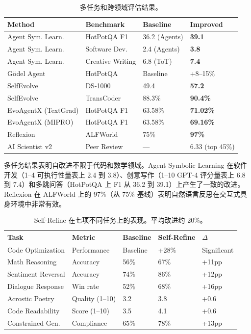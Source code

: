 \begin{table}[htbp]
\centering
\small
\caption{多任务和跨领域评估结果。}
\label{tab:eval-multitask}
\begin{tabular}{p{32mm}p{22mm}p{28mm}p{28mm}}
\toprule
\textbf{Method} & \textbf{Benchmark} & \textbf{Baseline} & \textbf{Improved} \\
\midrule
Agent Sym. Learn. & HotPotQA F1 & 36.2 (Agents) & \textbf{39.1} \\
Agent Sym. Learn. & Software Dev. & 2.4 (Agents) & \textbf{3.8} \\
Agent Sym. Learn. & Creative Writing & 6.8 (ToT) & \textbf{7.4} \\
G\"{o}del Agent & HotPotQA & Baseline & +8--15\% \\
SelfEvolve & DS-1000 & 49.4 & \textbf{57.2} \\
SelfEvolve & TransCoder & 88.3\% & \textbf{90.4\%} \\
EvoAgentX (TextGrad) & HotPotQA F1 & 63.58\% & \textbf{71.02\%} \\
EvoAgentX (MIPRO) & HotPotQA F1 & 63.58\% & \textbf{69.16\%} \\
Reflexion & ALFWorld & 75\% & \textbf{97\%} \\
AI Scientist v2 & Peer Review & --- & 6.33 (top 45\%) \\
\bottomrule
\end{tabular}
\end{table}

多任务结果表明自改进不限于代码和数学领域。Agent Symbolic Learning 在软件开发（1--4 可执行性量表上 2.4 到 3.8）、创意写作（1--10 GPT-4 评分量表上 6.8 到 7.4）和多跳问答（HotPotQA 上 F1 从 36.2 到 39.1）上产生了一致的改进。Reflexion 在 ALFWorld 上的 97\%（从 75\% 基线）表明自然语言反思在交互式具身环境中非常有效。

\begin{table}[htbp]
\centering
\small
\caption{Self-Refine 在七项不同任务上的表现。平均改进约 20\%。}
\label{tab:eval-selfrefine}
\begin{tabular}{p{30mm}p{25mm}p{20mm}p{20mm}p{15mm}}
\toprule
\textbf{Task} & \textbf{Metric} & \textbf{Baseline} & \textbf{Self-Refine} & \textbf{$\Delta$} \\
\midrule
Code Optimization & Performance & Baseline & +28\% & Significant \\
Math Reasoning & Accuracy & 56\% & 67\% & +11pp \\
Sentiment Reversal & Accuracy & 74\% & 86\% & +12pp \\
Dialogue Response & Win rate & 52\% & 68\% & +16pp \\
Acrostic Poetry & Quality (1--10) & 3.2 & 3.8 & +0.6 \\
Code Readability & Score (1--10) & 3.5 & 4.1 & +0.6 \\
Constrained Gen. & Compliance & 65\% & 78\% & +13pp \\
\bottomrule
\end{tabular}
\end{table}

